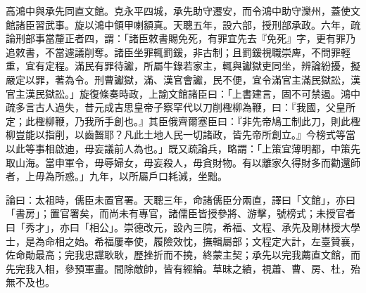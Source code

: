 \begin{pinyinscope}
高鴻中與承先同直文館。克永平四城，承先助守遷安，而令鴻中助守灤州，蓋使文館諸臣習武事。旋以鴻中領甲喇額真。天聰五年，設六部，授刑部承政。六年，疏論刑部事當釐正者四，謂：「諸臣敕書賜免死，有罪宜先去『免死』字，更有罪乃追敕書，不當遽議削奪。諸臣坐罪輒罰鍰，非古制；且罰鍰視職崇庳，不問罪輕重，宜有定程。滿民有罪待讞，所屬牛錄若家主，輒與讞獄吏同坐，辨論紛擾，擬嚴定以罪，著為令。刑曹讞獄，滿、漢官會讞，民不便，宜令滿官主滿民獄訟，漢官主漢民獄訟。」旋復條奏時政，上諭文館諸臣曰：「上書建言，固不可禁遏。鴻中疏多言古人過失，昔元成吉思皇帝子察罕代以刀削檉柳為鞭，曰：『我國，父皇所定；此檉柳鞭，乃我所手創也。』其臣俄齊爾塞臣曰：『非先帝鳩工制此刀，則此檉柳豈能以指削，以齒齧耶？凡此土地人民一切諸政，皆先帝所創立。』今榜式等當以此等事相啟迪，毋妄議前人為也。」既又疏論兵，略謂：「上策宜薄明都，中策先取山海。當申軍令，毋辱婦女，毋妄殺人，毋貪財物。有以離家久得財多而勸還師者，上毋為所惑。」九年，以所屬戶口耗減，坐黜。

論曰：太祖時，儒臣未置官署。天聰三年，命諸儒臣分兩直，譯曰「文館」，亦曰「書房」；置官署矣，而尚未有專官，諸儒臣皆授參將、游擊，號榜式；未授官者曰「秀才」，亦曰「相公」。崇德改元，設內三院，希福、文程、承先及剛林授大學士，是為命相之始。希福屢奉使，履險效忱，撫輯屬部；文程定大計，左臺贊襄，佐命勛最高；完我忠讜耿耿，歷挫折而不撓，終蒙主契；承先以完我薦直文館，而先完我入相，參預軍畫。間除敵帥，皆有經綸。草昧之績，視蕭、曹、房、杜，殆無不及也。


\end{pinyinscope}